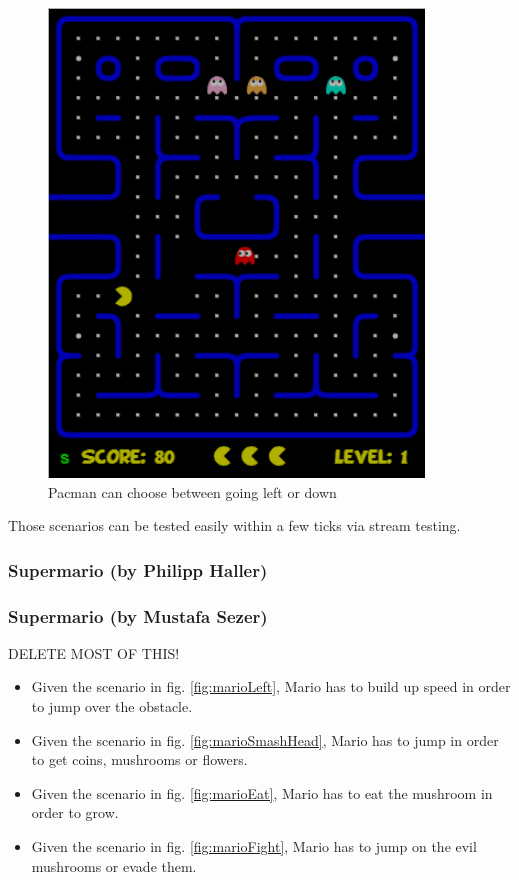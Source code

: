 \begin{figure}[!h]
	\centering
	\includegraphics[scale=0.55]{pictures/Pacman_Condition6.PNG}
	\caption{Pacman can choose between going left or down}
	\label{fig:pacmanCookie}
\end{figure}

Those scenarios can be tested easily within a few ticks via stream testing.

\subsubsection{Supermario (by Philipp Haller)}




\subsubsection{Supermario (by Mustafa Sezer)}
DELETE MOST OF THIS!
\begin{itemize}
	\item Given the scenario in fig. \ref{fig:marioLeft}, Mario has to build up speed in order to jump over the obstacle.
	\item Given the scenario in fig. \ref{fig:marioSmashHead}, Mario has to jump in order to get coins, mushrooms or flowers.
	\item Given the scenario in fig. \ref{fig:marioEat}, Mario has to eat the mushroom in order to grow.
	\item Given the scenario in fig. \ref{fig:marioFight}, Mario has to jump on the evil mushrooms or evade them.
\end{itemize}


